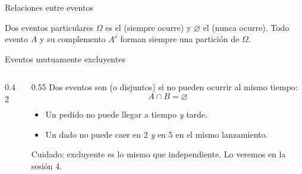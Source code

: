 \documentclass[aspectratio=169,10pt]{beamer}
\begin{document}
\begin{frame}{Relaciones entre eventos}
  \vspace{0.3cm}
  \begin{block}{Dos eventos particulares}
    \small
    $\Omega$ es el  (siempre ocurre) y $\varnothing$ el
     (nunca ocurre). Todo evento $A$ y su complemento
    $A^{c}$ forman siempre una partición de $\Omega$.
  \end{block}
\end{frame}

\begin{frame}{Eventos mutuamente excluyentes}
  \begin{columns}[T,onlytextwidth]
    \begin{column}{0.42\textwidth}
      \centering
    \end{column}
    \begin{column}{0.55\textwidth}
      Dos eventos son  (o disjuntos) si no
      pueden ocurrir al mismo tiempo:
      \[ A\cap B=\varnothing \]

      \vspace{0.2cm}
      \begin{itemize}
        \item Un pedido no puede llegar a tiempo \emph{y} tarde.
        \item Un dado no puede caer en 2 \emph{y} en 5 en el mismo lanzamiento.
      \end{itemize}

      \vspace{0.2cm}
      {\small\color{uniGris} Cuidado: excluyente  es lo mismo que
      independiente. Lo veremos en la sesión 4.}
    \end{column}
  \end{columns}
\end{frame}
\end{document}
